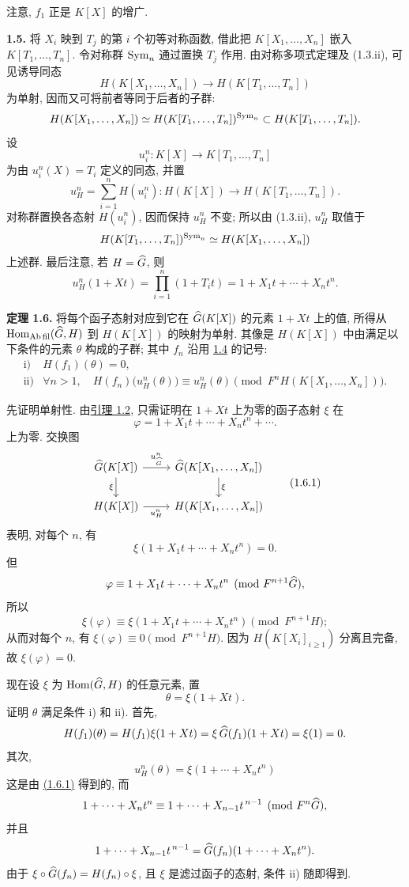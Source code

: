 注意, \(f_1\) 正是 \(K[X]\) 的增广.

\textbf{1.5.} 将 \(X_i\) 映到 \(T_j\) 的第 \(i\) 个初等对称函数, 借此把 \(K[X_1,\ldots,X_n]\) 嵌入 \(K[T_1,\ldots,T_n]\). 令对称群 \(\operatorname{Sym}_n\) 通过置换 \(T_j\) 作用. 由对称多项式定理及 (1.3.ii), 可见诱导同态
\[
  H(K[X_1,\ldots,X_n])\longrightarrow H(K[T_1,\ldots,T_n])
\]
为单射, 因而又可将前者等同于后者的子群:
\[
  H(K[X_1,\ldots,X_n])\simeq H(K[T_1,\ldots,T_n])^{\operatorname{Sym}_n}
  \subset H(K[T_1,\ldots,T_n]).
\]
设
\[
  u_i^n:K[X]\longrightarrow K[T_1,\ldots,T_n]
\]
为由 \(u_i^n(X)=T_i\) 定义的同态, 并置
\[
  u_H^n=\sum_{i=1}^n H(u_i^n):H(K[X])\longrightarrow H(K[T_1,\ldots,T_n]).
\]
对称群置换各态射 \(H(u_i^n)\), 因而保持 \(u_H^n\) 不变; 所以由 (1.3.ii), \(u_H^n\) 取值于
\[
  H(K[T_1,\ldots,T_n])^{\operatorname{Sym}_n}
   \simeq H(K[X_1,\ldots,X_n])
\]
上述群. 最后注意, 若 \(H=\widehat G\), 则
\[
  u_H^n(1+Xt)=\prod_{i=1}^n(1+T_it)=1+X_1t+\cdots+X_nt^n.
\]

\textbf{定理 1.6.} 将每个函子态射对应到它在 \(\widehat G(K[X])\) 的元素 \(1+Xt\) 上的值, 所得从 \(\operatorname{Hom}_{\mathrm{Ab\,fil}}(\widehat G,H)\) 到 \(H(K[X])\) 的映射为单射. 其像是 \(H(K[X])\) 中由满足以下条件的元素 \(\theta\) 构成的子群; 其中 \(f_n\) 沿用 \hyperlink{sga6.e05.para.1-4}{1.4} 的记号:
\[
\begin{array}{ll}
\text{i)}& H(f_1)(\theta)=0,\\[0.3em]
\text{ii)}& \forall n>1,\quad
 H(f_n)\bigl(u_H^n(\theta)\bigr)\equiv u_H^n(\theta)
 \pmod{F^nH(K[X_1,\ldots,X_n])}.
\end{array}
\]

先证明单射性. 由\hyperlink{sga6.e05.lem.1-2}{引理 1.2}, 只需证明在 \(1+Xt\) 上为零的函子态射 \(\xi\) 在
\[
  \varphi=1+X_1t+\cdots+X_nt^n+\cdots .
\]
上为零. 交换图
\[
\begin{tikzcd}
\Ghat(K[X]) \arrow[r,"u^n_{\Ghat}"] \arrow[d,"\xi"'] &
\Ghat(K[X_1,\ldots,X_n]) \arrow[d,"\xi"]\\
H(K[X]) \arrow[r,"u_H^n"'] &
H(K[X_1,\ldots,X_n])
\end{tikzcd}
\tag{1.6.1}
\]
表明, 对每个 \(n\), 有
\[
  \xi(1+X_1t+\cdots+X_nt^n)=0.
\]
但
\[
  \varphi\equiv 1+X_1t+\cdots+X_nt^n
  \pmod{F^{n+1}\widehat G},
\]
所以
\[
  \xi(\varphi)\equiv \xi(1+X_1t+\cdots+X_nt^n)
  \pmod{F^{n+1}H};
\]
从而对每个 \(n\), 有 \(\xi(\varphi)\equiv 0\pmod{F^{n+1}H}\). 因为 \(H(K[X_i]_{i\geq 1})\) 分离且完备, 故 \(\xi(\varphi)=0\).

现在设 \(\xi\) 为 \(\operatorname{Hom}(\widehat G,H)\) 的任意元素, 置
\[
  \theta=\xi(1+Xt).
\]
证明 \(\theta\) 满足条件 i) 和 ii). 首先,
\[
  H(f_1)(\theta)=H(f_1)\xi(1+Xt)
  =\xi\,\widehat G(f_1)(1+Xt)=\xi(1)=0.
\]
其次,
\[
  u_H^n(\theta)=\xi(1+\cdots+X_nt^n)
\]
这是由 \hyperlink{sga6.e05.eq.1-6-1}{(1.6.1)} 得到的, 而
\[
  1+\cdots+X_nt^n\equiv 1+\cdots+X_{n-1}t^{\,n-1}
  \pmod{F^n\widehat G},
\]
并且
\[
  1+\cdots+X_{n-1}t^{\,n-1}=\widehat G(f_n)(1+\cdots+X_nt^n).
\]
由于 \(\xi\circ \widehat G(f_n)=H(f_n)\circ \xi\), 且 \(\xi\) 是滤过函子的态射, 条件 ii) 随即得到. %

